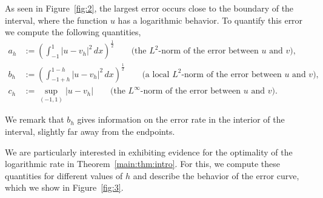 \documentclass[10 pt]{article}
\numberwithin{equation}{section}
\begin{document}
As seen in Figure~\ref{fig:2}, the largest error occurs close to the boundary of the interval, where the function $u$ has a logarithmic behavior.  To quantify this error we compute the following quantities,
\begin{align*}
 a_h&:=\left(\int_{-1}^1 |u-v_h|^2\, dx\right)^\frac{1}{2}\qquad \text{(the $L^2$-norm of the error between $u$ and $v$)},\\
 b_h&:=\left(\int_{-1+h}^{1-h} |u-v_h|^2\, dx\right)^\frac{1}{2}\qquad \text{(a local $L^2$-norm of the error between $u$ and $v$)},\\
 c_h&:=\sup_{(-1,1)} |u-v_h|\qquad \text{(the $L^\infty$-norm of the error between $u$ and $v$)}.
\end{align*}

We remark that $b_h$ gives information on the error rate in the interior of the interval, slightly far away from the endpoints. 

We are particularly interested in exhibiting evidence for the optimality of the logarithmic rate in Theorem~\ref{main:thm:intro}.  For this, we compute these quantities for different values of $h$ and describe the behavior of the error curve, which we show in Figure~\ref{fig:3}.
\end{document}

